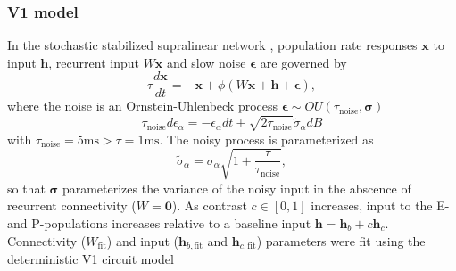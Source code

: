 \documentclass[11pt]{article}
\begin{document}
\subsubsection{V1 model}
In the stochastic stabilized supralinear network \cite{hennequin2018dynamical}, population rate responses $\mathbf{x}$ to input $\mathbf{h}$, recurrent input $W\mathbf{x}$ and slow noise $\bm{\epsilon}$ are governed by
\begin{equation}
    \tau \frac{d\mathbf{x}}{dt} = -\mathbf{x} +\phi(W\mathbf{x} + \mathbf{h} + \bm{\epsilon}),
\end{equation}
where the noise is an Ornstein-Uhlenbeck process $\bm{\epsilon} \sim OU(\tau_{\text{noise}}, \bm{\sigma})$
\begin{equation}
\tau_{\text{noise}} d\epsilon_\alpha = -\epsilon_\alpha dt + \sqrt{2\tau_{\text{noise}}}\tilde{\sigma}_\alpha dB
\end{equation}
with $\tau_{\text{noise}} = 5\text{ms} > \tau = 1\text{ms}$.
The noisy process is parameterized as
\begin{equation}
\tilde{\sigma}_\alpha = \sigma_\alpha \sqrt{1 + \frac{\tau}{\tau_{\text{noise}}}},
\end{equation}
so that $\bm{\sigma}$ parameterizes the variance of the noisy input in the abscence of recurrent connectivity ($W = \bm{0}$).
As contrast $c \in [0, 1]$ increases, input to the E- and P-populations increases  relative to a baseline input $\mathbf{h} = \mathbf{h}_b + c\mathbf{h}_c$.
Connectivity ($W_{\text{fit}}$) and input ($\mathbf{h}_{b,\text{fit}}$ and $\mathbf{h}_{c,\text{fit}}$) parameters were fit using the deterministic V1 circuit model \cite{palmigiano2020structure} 
\end{document}
